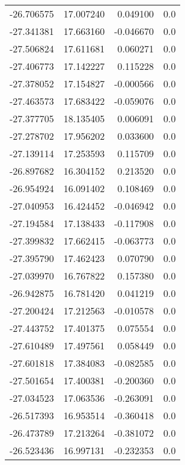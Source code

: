 \begin{tabular}{rrrr}
      -26.706575 &        17.007240 &    0.049100 &   0.0 \\
      -27.341381 &        17.663160 &   -0.046670 &   0.0 \\
      -27.506824 &        17.611681 &    0.060271 &   0.0 \\
      -27.406773 &        17.142227 &    0.115228 &   0.0 \\
      -27.378052 &        17.154827 &   -0.000566 &   0.0 \\
      -27.463573 &        17.683422 &   -0.059076 &   0.0 \\
      -27.377705 &        18.135405 &    0.006091 &   0.0 \\
      -27.278702 &        17.956202 &    0.033600 &   0.0 \\
      -27.139114 &        17.253593 &    0.115709 &   0.0 \\
      -26.897682 &        16.304152 &    0.213520 &   0.0 \\
      -26.954924 &        16.091402 &    0.108469 &   0.0 \\
      -27.040953 &        16.424452 &   -0.046942 &   0.0 \\
      -27.194584 &        17.138433 &   -0.117908 &   0.0 \\
      -27.399832 &        17.662415 &   -0.063773 &   0.0 \\
      -27.395790 &        17.462423 &    0.070790 &   0.0 \\
      -27.039970 &        16.767822 &    0.157380 &   0.0 \\
      -26.942875 &        16.781420 &    0.041219 &   0.0 \\
      -27.200424 &        17.212563 &   -0.010578 &   0.0 \\
      -27.443752 &        17.401375 &    0.075554 &   0.0 \\
      -27.610489 &        17.497561 &    0.058449 &   0.0 \\
      -27.601818 &        17.384083 &   -0.082585 &   0.0 \\
      -27.501654 &        17.400381 &   -0.200360 &   0.0 \\
      -27.034523 &        17.063536 &   -0.263091 &   0.0 \\
      -26.517393 &        16.953514 &   -0.360418 &   0.0 \\
      -26.473789 &        17.213264 &   -0.381072 &   0.0 \\
      -26.523436 &        16.997131 &   -0.232353 &   0.0 \\

\end{tabular}
